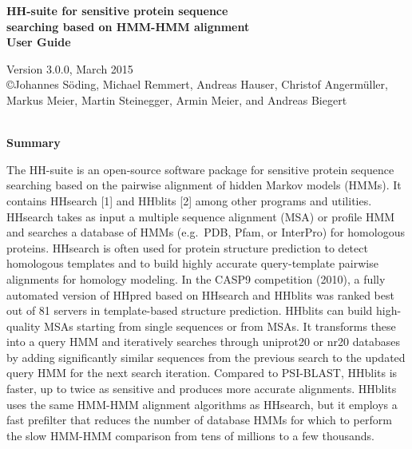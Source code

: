 \documentclass[11pt,a4paper]{article}
\newcommand{\hhversion}{Version 3.0.0, March 2015}
\begin{document}


\begin{center}

\vspace{20mm}
 
{\huge \bf HH-suite for sensitive protein sequence\\[2mm] searching based on HMM-HMM alignment}\\[4mm] 

{\Large \bf User Guide}

  \hhversion\\[2mm]
{\copyright  Johannes S\"oding, Michael Remmert, Andreas Hauser, Christof Angerm\"uller,  Markus Meier, Martin Steinegger, Armin Meier, and Andreas Biegert}\\[2mm]\


{\bf \Large Summary}

\end{center}

\noindent The HH-suite is an open-source software package for sensitive protein sequence searching based on the pairwise alignment of hidden Markov models (HMMs). It contains HHsearch [1] and HHblits [2] among other programs and utilities. HHsearch takes as input a multiple sequence alignment (MSA) or profile HMM and searches a database of HMMs (e.g.\ PDB, Pfam, or InterPro) for homologous proteins. HHsearch is often used for protein structure prediction to detect homologous templates and to build highly accurate query-template pairwise alignments for homology modeling. In the CASP9 competition (2010), a fully automated version of HHpred based on HHsearch and HHblits was ranked best out of 81 servers in template-based structure prediction. HHblits can build high-quality MSAs starting from single sequences or from MSAs. It transforms these into a query HMM and iteratively searches through uniprot20 or nr20 databases by adding significantly similar sequences from the previous search to the updated query HMM for the next search iteration. Compared to PSI-BLAST, HHblits is faster, up to twice as sensitive and produces more accurate alignments. HHblits uses the same HMM-HMM alignment algorithms as HHsearch, but it employs a fast prefilter that reduces the number of database HMMs for which to perform the slow HMM-HMM comparison from tens of millions to a few thousands. 
\\[2mm]
\end{document}
